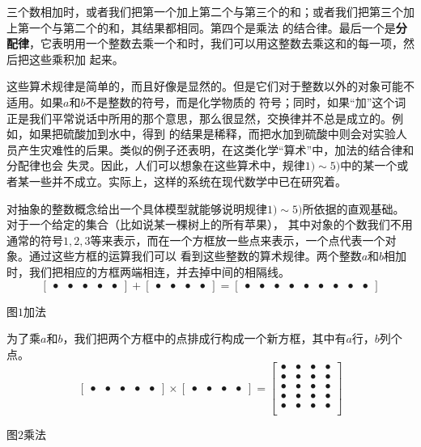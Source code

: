 三个数相加时，或者我们把第一个加上第二个与第三个的和；或者我们把第三个加上第一个与第二个的和，其结果都相同。第四个是乘法
的结合律。最后一个是\textbf{分配律}，它表明用一个整数去乘一个和时，我们可以用这整数去乘这和的每一项，然后把这些乘积加
起来。

这些算术规律是简单的，而且好像是显然的。但是它们对于整数以外的对象可能不适用。如果$a$和$b$不是整数的符号，而是化学物质的
符号；同时，如果“加”这个词正是我们平常说话中所用的那个意思，那么很显然，交换律并不总是成立的。例如，如果把硫酸加到水中，得到
的结果是稀释，而把水加到硫酸中则会对实验人员产生灾难性的后果。类似的例子还表明，在这类化学“算术”中，加法的结合律和分配律也会
失灵。因此，人们可以想象在这些算术中，规律$1)\sim5)$中的某一个或者某一些并不成立。实际上，这样的系统在现代数学中已在研究着。

对抽象的整数概念给出一个具体模型就能够说明规律$1)\sim5)$所依据的直观基础。对于一个给定的集合（比如说某一棵树上的所有苹果），
其中对象的个数我们不用通常的符号$1,2,3$等来表示，而在一个方框放一些点来表示，一个点代表一个对象。通过这些方框的运算我们可以
看到这些整数的算术规律。两个整数$a$和$b$相加时，我们把相应的方框两端相连，并去掉中间的相隔线。
\begin{equation*}
\begin{bmatrix} \bullet &\bullet &\bullet &\bullet &\bullet\end{bmatrix}+
\begin{bmatrix} \bullet &\bullet &\bullet &\bullet\end{bmatrix}= 
\begin{bmatrix} \bullet &\bullet &\bullet &\bullet &\bullet &\bullet &\bullet &\bullet
&\bullet\end{bmatrix}
\end{equation*}
\begin{center}
图$1$\quad 加法
\end{center}

为了乘$a$和$b$，我们把两个方框中的点排成行构成一个新方框，其中有$a$行，$b$列个点。
\begin{equation*}
\begin{bmatrix} \bullet &\bullet &\bullet &\bullet &\bullet\end{bmatrix} \times
\begin{bmatrix} \bullet &\bullet &\bullet &\bullet\end{bmatrix}= 
\begin{bmatrix}
\bullet &\bullet &\bullet &\bullet \\
\bullet &\bullet &\bullet &\bullet \\
\bullet &\bullet &\bullet &\bullet \\
\bullet &\bullet &\bullet &\bullet \\
\bullet &\bullet &\bullet &\bullet \\
\end{bmatrix}
\end{equation*}
\begin{center}
图$2$\quad 乘法
\end{center}

